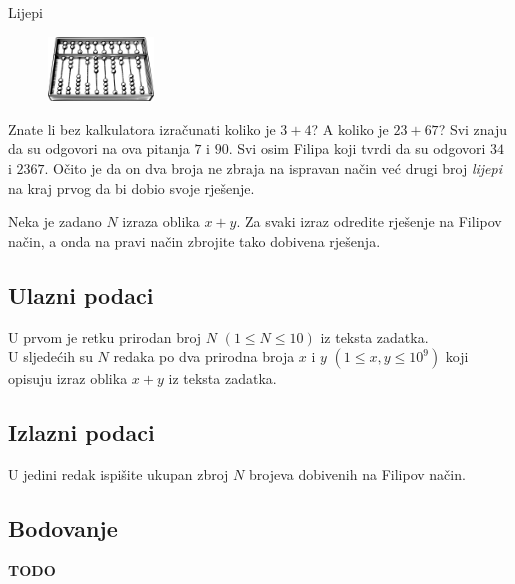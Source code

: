 \begin{statement}[
  problempoints=30,
  timelimit=1 sekunda,
  memorylimit=512 MiB,
]{Lijepi}

\setlength\intextsep{-0.1cm}
\begin{figure}
\centering
\includegraphics[width=0.25\textwidth]{img/abacus.png}
\end{figure}

Znate li bez kalkulatora izračunati koliko je $3+4$? A koliko je $23+67$? Svi
znaju da su odgovori na ova pitanja $7$ i $90$. Svi osim Filipa koji tvrdi da
su odgovori $34$ i $2367$. Očito je da on dva broja ne zbraja na ispravan način
već drugi broj \textit{lijepi} na kraj prvog da bi dobio svoje rješenje.

Neka je zadano $N$ izraza oblika $x+y$. Za svaki izraz odredite rješenje na
Filipov način, a onda na pravi način zbrojite tako dobivena rješenja.

\subsection*{Ulazni podaci}
U prvom je retku prirodan broj $N$ $(1 \le N \le 10)$ iz teksta zadatka. \\
U sljedećih su $N$ redaka po dva prirodna broja $x$ i $y$ $(1 \le x, y \le 10^9)$
koji opisuju izraz oblika $x+y$ iz teksta zadatka.

\subsection*{Izlazni podaci}
U jedini redak ispišite ukupan zbroj $N$ brojeva dobivenih na Filipov način.

\subsection*{Bodovanje}
\textbf{TODO}


\end{statement}
